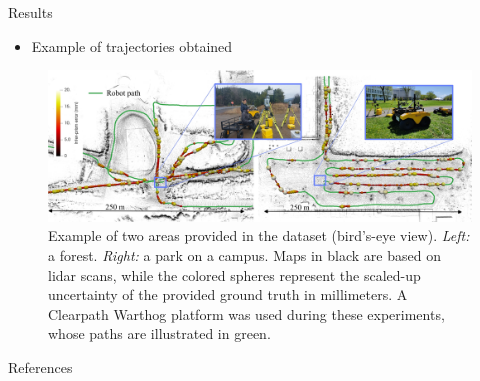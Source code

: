 \documentclass[final,hyperref={pdfpagelabels=false}]{beamer}
\begin{document}
\begin{frame}[t]
\begin{columns}[t]
\begin{column}{.465\textwidth}
\begin{block}{Results}
\begin{itemize}
    \item Example of trajectories obtained
\end{itemize}
    \begin{figure}
        \includegraphics[width=\linewidth]
            {figures/figure_intro.jpg}%
        \captionsetup{width = 0.975\linewidth, justification=justified, name=Figure 4}
        \caption{
            Example of two areas provided in the dataset (bird's-eye view). \emph{Left:} a forest. \emph{Right:} a park on a campus.
            Maps in black are based on lidar scans, while the colored spheres represent the scaled-up uncertainty of the provided ground truth in millimeters.  
            A Clearpath Warthog platform was used during these experiments, whose paths are illustrated in green.}
        \label{fig:setup_outside}
    \end{figure}
	
\end{block}



\begin{block}{References}
	\footnotesize%
	{\footnotesize}
\end{block}




\end{column}
\end{columns}
\end{frame}
\end{document}
